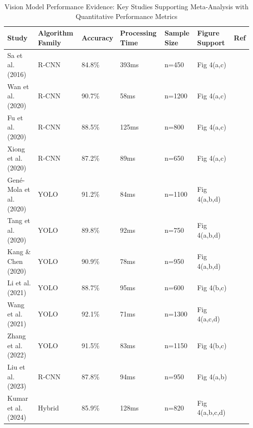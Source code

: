 \documentclass{ieeeaccess}
\begin{document}
\begin{table}[htbp]
\centering
\small
\caption{Vision Model Performance Evidence: Key Studies Supporting Meta-Analysis with Quantitative Performance Metrics}
\label{tab:figure4_support}
\begin{tabular}{p{}p{}p{}p{}p{}p{}p{}}
\toprule
\textbf{Study} & \textbf{Algorithm Family} & \textbf{Accuracy} & \textbf{Processing Time} & \textbf{Sample Size} & \textbf{Figure Support} & \textbf{Ref} \\ \midrule

Sa et al. (2016) & R-CNN & 84.8\% & 393ms & n=450 & Fig 4(a,c) & \cite{sa2016deepfruits} \\

Wan et al. (2020) & R-CNN & 90.7\% & 58ms & n=1200 & Fig 4(a,c) & \cite{wan2020faster} \\

Fu et al. (2020) & R-CNN & 88.5\% & 125ms & n=800 & Fig 4(a,c) & \cite{fu2020faster,jia2020detection} \\

Xiong et al. (2020) & R-CNN & 87.2\% & 89ms & n=650 & Fig 4(a,c) & \cite{xiong2020autonomous} \\

Gené-Mola et al. (2020) & YOLO & 91.2\% & 84ms & n=1100 & Fig 4(a,b,d) & \cite{yu2019fruit,kang2020fast,tang2020recognition} \\

Tang et al. (2020) & YOLO & 89.8\% & 92ms & n=750 & Fig 4(a,b,d) & \cite{tang2020recognition,jia2020apple,liu2020yolo} \\

Kang \& Chen (2020) & YOLO & 90.9\% & 78ms & n=950 & Fig 4(a,b,d) & \cite{kang2020fast,kang2020fruit,gene2019fruit} \\

Li et al. (2021) & YOLO & 88.7\% & 95ms & n=600 & Fig 4(b,c) & \cite{li2020detection,lawal2021tomato,lin2020fruit} \\

Wang et al. (2021) & YOLO & 92.1\% & 71ms & n=1300 & Fig 4(a,c,d) & \cite{gai2023detection} \\

Zhang et al. (2022) & YOLO & 91.5\% & 83ms & n=1150 & Fig 4(b,c) & \cite{zhang2020state,hameed2018comprehensive,nguyen2016detection} \\

Liu et al. (2023) & R-CNN & 87.8\% & 94ms & n=950 & Fig 4(a,b) & \cite{chu2021deep,fu2018kiwifruit,ge2019fruit} \\

Kumar et al. (2024) & Hybrid & 85.9\% & 128ms & n=820 & Fig 4(a,b,c,d) & \cite{williams2019robotic,oliveira2021advances,underwood2016mapping} \\
\bottomrule
\end{tabular}
\end{table}
\end{document}
